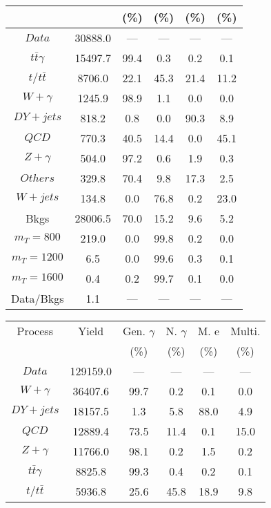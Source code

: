 \begin{figure}
\begin{minipage}[c]{0.32\textwidth}
{\begin{tabular}{cccccc}
 &  & (\%) & (\%) & (\%) & (\%)  \\
\hline
                                                                      $ Data $ &  30888.0 &  --- &  --- &  --- &  ---\\
$ t\bar{t}\gamma $ &  15497.7 &  99.4 &  0.3 &  0.2 &  0.1\\
$ t/t\bar{t} $ &  8706.0 &  22.1 &  45.3 &  21.4 &  11.2\\
$ W+\gamma $ &  1245.9 &  98.9 &  1.1 &  0.0 &  0.0\\
$ DY+jets $ &  818.2 &  0.8 &  0.0 &  90.3 &  8.9\\
$ QCD $ &  770.3 &  40.5 &  14.4 &  0.0 &  45.1\\
$ Z+\gamma $ &  504.0 &  97.2 &  0.6 &  1.9 &  0.3\\
$ Others $ &  329.8 &  70.4 &  9.8 &  17.3 &  2.5\\
$ W+jets $ &  134.8 &  0.0 &  76.8 &  0.2 &  23.0\\
Bkgs &  28006.5 &  70.0 &  15.2 &  9.6 &  5.2\\
$ m_{T} = 800 $ &  219.0 &  0.0 &  99.8 &  0.2 &  0.0\\
$ m_{T} = 1200 $ &  6.5 &  0.0 &  99.6 &  0.3 &  0.1\\
$ m_{T} = 1600 $ &  0.4 &  0.2 &  99.7 &  0.1 &  0.0\\
Data/Bkgs &  1.1 &  --- &  --- &  --- &  ---\\
\hline
\end{tabular}
}
\end{minipage}
\begin{minipage}[c]{0.32\textwidth}
\centering
\tiny{
\begin{tabular}{cccccc}
\hline
Process & Yield & Gen. $\gamma$ & N. $\gamma$ & M. e & Multi. \\
 &  & (\%) & (\%) & (\%) & (\%)  \\
\hline
                                                                      $ Data $ &  129159.0 &  --- &  --- &  --- &  ---\\
$ W+\gamma $ &  36407.6 &  99.7 &  0.2 &  0.1 &  0.0\\
$ DY+jets $ &  18157.5 &  1.3 &  5.8 &  88.0 &  4.9\\
$ QCD $ &  12889.4 &  73.5 &  11.4 &  0.1 &  15.0\\
$ Z+\gamma $ &  11766.0 &  98.1 &  0.2 &  1.5 &  0.2\\
$ t\bar{t}\gamma $ &  8825.8 &  99.3 &  0.4 &  0.2 &  0.1\\
$ t/t\bar{t} $ &  5936.8 &  25.6 &  45.8 &  18.9 &  9.8\\

\end{tabular}}
\end{minipage}
\end{figure}
